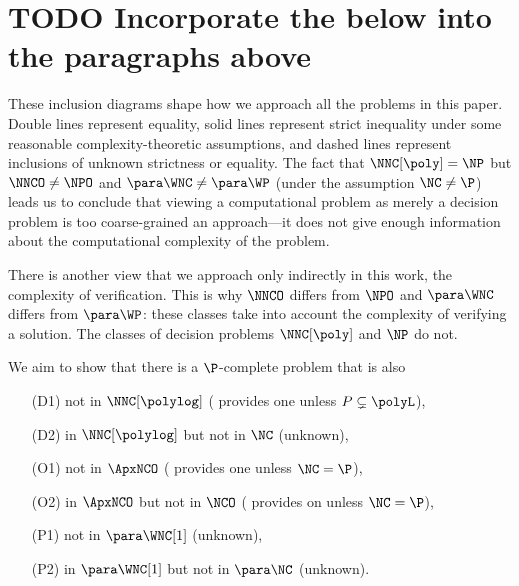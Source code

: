 \section{TODO Incorporate the below into the paragraphs above}


\begin{minipage}[t]{0.31\linewidth}
  \centering
  
\end{minipage}%
\begin{minipage}[t]{0.31\linewidth}
  \centering
  
\end{minipage}%
\begin{minipage}[t]{0.31\linewidth}
  \centering
  
\end{minipage}

These inclusion diagrams shape how we approach all the problems in this paper.
Double lines represent equality, solid lines represent strict inequality under some reasonable complexity-theoretic assumptions, and dashed lines represent inclusions of unknown strictness or equality.
The fact that $\NNC[\poly] = \NP$ but $\NNCO \neq \NPO$ and $\para \WNC \neq \para \WP$ (under the assumption $\NC \neq \P$) leads us to conclude that viewing a computational problem as merely a decision problem is too coarse-grained an approach---it does not give enough information about the computational complexity of the problem.

There is another view that we approach only indirectly in this work, the complexity of verification.
This is why $\NNCO$ differs from $\NPO$ and $\para \WNC$ differs from $\para \WP$: these classes take into account the complexity of verifying a solution.
The classes of decision problems $\NNC[\poly]$ and $\NP$ do not.


We aim to show that there is a $\P$-complete problem that is also
\begin{enumerate}
\item[(D1)] not in $\NNC[\polylog]$ (\autocite[Theorem~3.9]{ncpcp} provides one unless $P \subsetneq \polyL$),
\item[(D2)] in $\NNC[\polylog]$ but not in $\NC$ (unknown),
\item[(O1)] not in $\ApxNCO$ (\autocite[Theorem~3.25]{ncapproximation} provides one unless $\NC = \P$),
\item[(O2)] in $\ApxNCO$ but not in $\NCO$ (\autocite[Theorem~3.25]{ncapproximation} provides on unless $\NC = \P$),
\item[(P1)] not in $\para \WNC[1]$ (unknown),
\item[(P2)] in $\para \WNC[1]$ but not in $\para \NC$ (unknown).
\end{enumerate}

